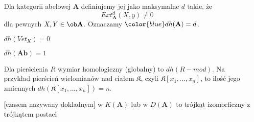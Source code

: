 \begin{definition}
  Dla kategorii abelowej $\mathbf{A}$ definiujemy jej  jako maksymalne $d$ takie, że 
  $$Ext_{\mathbf{A}}^d(X, y)\neq0 $$
  dla pewnych $X,Y\in\ob\mathbf{A}$. Oznaczamy $\color{blue}dh(\mathbf{A})=d$.
\end{definition}

\begin{example}
\item $dh(Vet_K)=0$
\item $dh(\mathbf{Ab})=1$
\item Dla pierścienia $R$ wymiar homologiczny (globalny) to $dh(R-mod)$. Na przykład pierścień wielomianów nad ciałem $\mathfrak{K}$, czyli $\mathfrak{K}[x_1,...,x_n]$, to ilość jego zmiennych $dh(\mathfrak{K}[x_1,..., x_n])=n$.
\end{example}

\begin{definition}
   [czasem nazywany dokladnym] w $K(\mathbf{A})$ lub w $D(\mathbf{A})$ to trójkąt izomorficzny z trójkątem postaci
  \begin{center}\end{center}
\end{definition}

